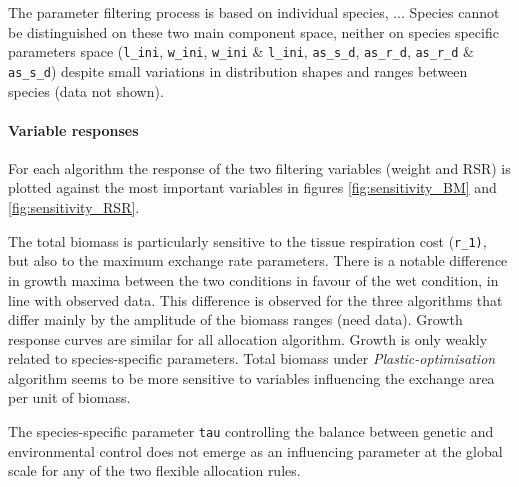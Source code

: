The parameter filtering process is based on individual species, ... Species cannot be distinguished on these two main component space, neither on species specific parameters space (\texttt{l\_ini}, \texttt{w\_ini}, \texttt{w\_ini} \& \texttt{l\_ini}, \texttt{as\_s\_d}, \texttt{as\_r\_d}, \texttt{as\_r\_d} \& \texttt{as\_s\_d}) despite small variations in distribution shapes and ranges between species (data not shown).\\

\paragraph{Variable responses}
For each algorithm the response of the two filtering variables (weight and RSR) is plotted against the most important variables in figures \ref{fig:sensitivity_BM} and \ref{fig:sensitivity_RSR}.

The total biomass is particularly sensitive to the tissue respiration cost (\texttt{r\_1)}, but also to the maximum exchange rate parameters. There is a notable difference in growth maxima between the two conditions in favour of the wet condition, in line with observed data. This difference is observed for the three algorithms that differ mainly by the amplitude of the biomass ranges (need data). Growth response curves are similar for all allocation algorithm. Growth is only weakly related to species-specific parameters. Total biomass under \textit{Plastic-optimisation} algorithm seems to be more sensitive to variables influencing the exchange area per unit of biomass.

The species-specific parameter \texttt{tau} controlling the balance between genetic and environmental control does not emerge as an influencing parameter at the global scale for any of the two flexible allocation rules.


